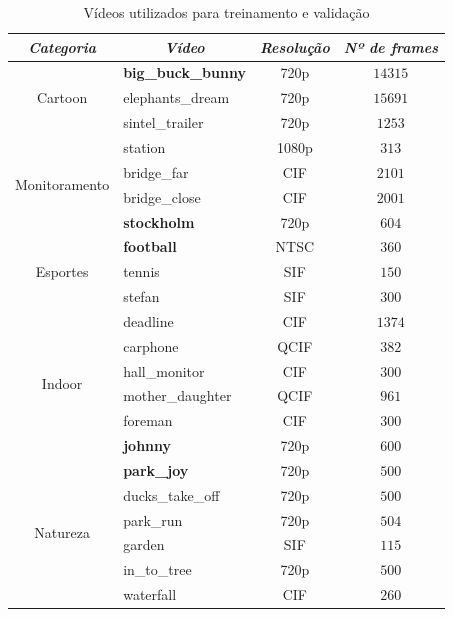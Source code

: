 \documentclass[cic,tc]{iiufrgs}
\begin{document}
\begin{table}[h]
    \caption{Vídeos utilizados para treinamento e validação}
    \centering
        \begin{tabular}{|c|l|c|c|}
          \hline
          \multicolumn{1}{|c}{\textit{Categoria}} & 
          \multicolumn{1}{|c}{\textit{Vídeo}} & 
          \multicolumn{1}{|c}{\textit{Resolução}} & 
          \multicolumn{1}{|c|}{\textit{Nº de frames}}  \\
          \hline
          \hline
          \multirow{3}{*}{Cartoon} & \textbf{big\_buck\_bunny} & 720p & $ 14315 $ \\
          & elephants\_dream & 720p & $ 15691 $ \\
          & sintel\_trailer & 720p & $ 1253 $ \\ \hline
          \multirow{4}{*}{Monitoramento} & station & 1080p & $313$ \\
          & bridge\_far & CIF & $2101$ \\
          & bridge\_close & CIF & $2001$ \\
          & \textbf{stockholm} & 720p & $604$ \\ \hline 
          \multirow{3}{*}{Esportes} & \textbf{football} & NTSC & $360$ \\
          & tennis & SIF & $150$ \\
          & stefan & SIF & $300$ \\ \hline
          \multirow{6}{*}{Indoor} & deadline & CIF & $1374$ \\
          & carphone & QCIF & $382$ \\
          & hall\_monitor & CIF & $300$ \\
          & mother\_daughter & QCIF & $961$ \\
          & foreman & CIF & $300$ \\
          & \textbf{johnny} & 720p & $600$ \\ \hline
          \multirow{6}{*}{Natureza} & \textbf{park\_joy} & 720p & $500$ \\
          & ducks\_take\_off & 720p & $500$ \\
          & park\_run & 720p & $504$ \\
          & garden & SIF & $115$ \\
          & in\_to\_tree & 720p & $500$ \\
          & waterfall & CIF & $260$ \\
          \hline
        \end{tabular}
    \label{tbl:vidtrain}
\end{table}
\end{document}
